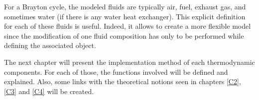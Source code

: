 For a Brayton cycle, the modeled fluids are typically air, fuel, exhaust gas, and sometimes water (if there is any water heat exchanger). This explicit definition for each of these fluids is useful. Indeed, it allows to create a more flexible model since the modification of one fluid composition has only to be performed while defining the associated object. 

The next chapter will present the implementation method of each thermodynamic components. For each of those, the functions involved will be defined and explained. Also, some links with the theoretical notions seen in chapters \ref{C2}, \ref{C3} and \ref{C4} will be created.





 